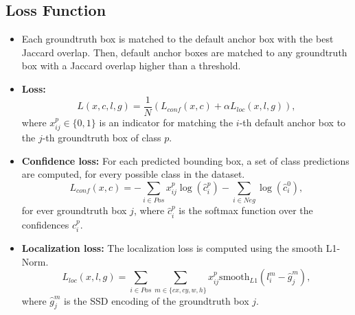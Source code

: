 \documentclass[a0, portrait]{a0poster}
\begin{document}
\begin{multicols}{3}
\subsection*{Loss Function}

\begin{itemize}
  \item Each groundtruth box is matched to the default anchor box with the best Jaccard overlap. Then, default anchor boxes are matched to any groundtruth box with a Jaccard overlap higher than a threshold.
  \item \textbf{Loss:}
  \begin{equation*}
    L(x, c, l, g) = \frac{1}{N}(L_{conf}(x, c) + \alpha L_{loc}(x, l, g)),
  \end{equation*}
  where $x_{ij}^p \in \{0, 1\}$ is an indicator for matching the $i$-th default anchor box to the $j$-th groundtruth box of class $p$.
  \item \textbf{Confidence loss:} For each predicted bounding box, a set of class predictions are computed, for every possible class in the dataset.
  \begin{equation*}
    L_{conf}(x, c) = -\sum_{i \in Pos} x_{ij}^p \log(\hat{c}_i^p) - \sum_{i \in Neg} \log(\hat{c}_i^0),
  \end{equation*}
  for ever groundtruth box $j$, where $\hat{c}_i^p$ is the softmax function over the confidences $c_i^p$.
  \item \textbf{Localization loss:} The localization loss is computed using the smooth L1-Norm.
  \begin{equation*}
    L_{loc}(x, l, g) = \sum_{i \in Pos} \sum_{m \in \{cx, cy, w, h\}} x_{ij}^p \text{smooth}_{L1}(l_i^m - \hat{g}_j^m),
  \end{equation*}
  where $\hat{g}_j^m$ is the SSD encoding of the groundtruth box $j$.
\end{itemize}


\end{multicols}
\end{document}
